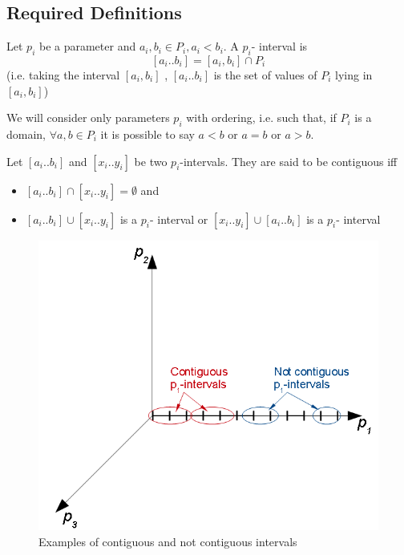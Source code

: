 \subsection{Required Definitions}
\begin{definition} Let $p_{i}$ be a parameter and $a_{i},b_{i}\in P_{i},a_{i}<b_{i}$.
A $p_{i}$- interval is
\[
\left[a_{i}..b_{i}\right]=\left[a_{i},b_{i}\right]\cap P_{i}
\]
 (i.e. taking the interval $\left[a_{i},b_{i}\right]$ , $\left[a_{i}..b_{i}\right]$
is the set of values of $P_{i}$ lying in $\left[a_{i},b_{i}\right]$)
\end{definition}

\begin{remark}
We will consider only parameters $p_{i}$ with ordering, i.e. such
that, if $P_{i}$ is a domain, $\forall a,b\in P_{i}$ it is possible
to say $a<b$ or $a=b$ or $a>b$.
\end{remark}

\begin{definition}
\label{pers02.def:Contiguous-intervals}
Let $\left[a_{i}..b_{i}\right]$ and $\left[x_{i}..y_{i}\right]$
be two $p_{i}$-intervals. They are said to be contiguous iff
\begin{itemize}
\item $\left[a_{i}..b_{i}\right]\cap\left[x_{i}..y_{i}\right]=\emptyset$
and
\item $\left[a_{i}..b_{i}\right]\cup\left[x_{i}..y_{i}\right]$ is a $p_{i}$-
interval or $\left[x_{i}..y_{i}\right]\cup\left[a_{i}..b_{i}\right]$
is a $p_{i}$- interval
\end{itemize}
\end{definition}
\begin{figure}[h]
\includegraphics[width=0.5\columnwidth]{img/contiguous_intervals_or_not}

\caption{Examples of contiguous and not contiguous intervals}

\end{figure}

